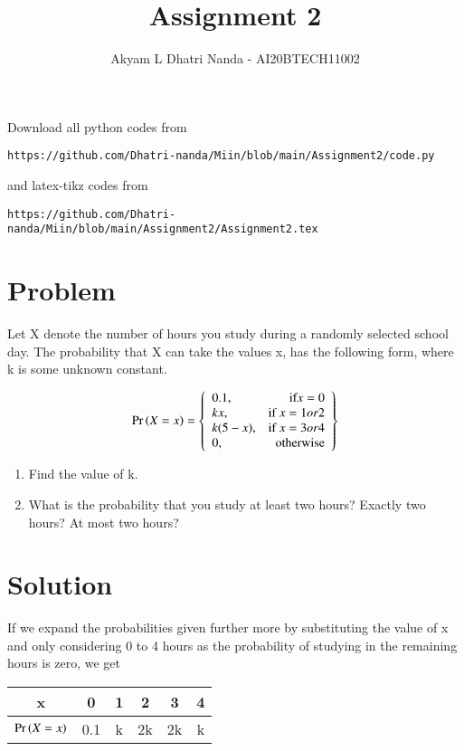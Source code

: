 \documentclass[journal,12pt,twocolumn]{IEEEtran}
\begin{document}
     \def\rightbox#1{\makebox[0in][r]{#1}}
     \def\centbox#1{\makebox[0in]{#1}}
     \def\topbox#1{\raisebox{-\baselineskip}[0in][0in]{#1}}
     \def\midbox#1{\raisebox{-0.5\baselineskip}[0in][0in]{#1}}
\vspace{3cm}
\title{Assignment 2}
\author{Akyam L Dhatri Nanda - AI20BTECH11002}
\maketitle
\newpage
\bigskip
\renewcommand{\thefigure}{\theenumi}
\renewcommand{\thetable}{\theenumi}
Download all python codes from 
\begin{lstlisting}
https://github.com/Dhatri-nanda/Miin/blob/main/Assignment2/code.py
\end{lstlisting}
%
and latex-tikz codes from 
%
\begin{lstlisting}
https://github.com/Dhatri-nanda/Miin/blob/main/Assignment2/Assignment2.tex
\end{lstlisting}
\section{Problem}
Let X denote the number of hours you study during a randomly selected school day. The probability that X can take the values x, has the following form, where k is some unknown constant.

\[
    \Pr\left(X = x\right) = \left\{\begin{array}{lr}
        0.1, &\text{if} x = 0\\
        kx, & \text{if } x = 1 or 2\\
        k(5-x), & \text{if } x = 3 or 4\\
        0, & \text{otherwise}
        \end{array}\right\}
  \]
  
  \begin{enumerate}[label={\Alph*)}]
   \item Find the value of k.
   \item What is the probability that you study at least two hours? Exactly two hours? At most two hours?
  \end{enumerate}
  
  \section{Solution}
  
  If we expand the probabilities given further more by substituting the value of x and only considering 0 to 4 hours as the probability of studying in the remaining hours is zero, we get\vspace{3mm}
 \begin{center}
  
  \begin{tabular}{|c|c|c|c|c|c|}
    \hline
    x &  0 & 1 & 2 & 3 & 4\\
    \hline
    $\Pr\left(X=x\right)$ & 0.1& k& 2k & 2k & k\\
    \hline
    
\end{tabular}
\end{center}
\end{document}
